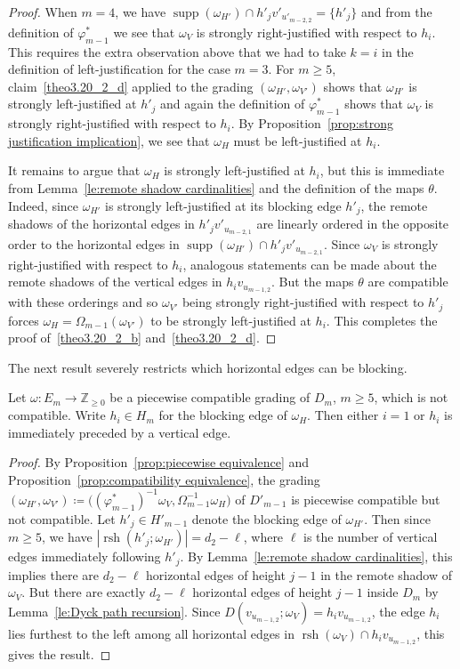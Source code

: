 \documentclass[ALCO,ThmDefs,Unicode,epreuves]{cedram}
\newcommand{\ZZ}{\mathbb{Z}}
\DeclareMathOperator{\supp}{supp}
\DeclareMathOperator{\rsh}{rsh}
\begin{document}
\begin{proof}
 When $m=4$, we have $\supp(\omega_{H'})\cap h'_jv'_{u'_{m-2,2}}=\{h'_j\}$ and from the definition of $\varphi^*_{m-1}$ we see that $\omega_V$ is strongly right-justified with respect to $h_i$.
 This requires the extra observation above that we had to take $k=i$ in the definition of left-justification for the case $m=3$.
 For $m\ge5$, claim~\ref{theo3.20_2_d} applied to the grading $(\omega_{H'},\omega_{V'})$ shows that $\omega_{H'}$ is strongly left-justified at $h'_j$ and again the definition of $\varphi^*_{m-1}$ shows that $\omega_V$ is strongly right-justified with respect to $h_i$. 
 By Proposition~\ref{prop:strong justification implication}, we see that $\omega_H$ must be left-justified at $h_i$. 

 It remains to argue that $\omega_H$ is strongly left-justified at $h_i$, but this is immediate from Lemma~\ref{le:remote shadow cardinalities} and the definition of the maps $\theta$. 
 Indeed, since $\omega_{H'}$ is strongly left-justified at its blocking edge $h'_j$, the remote shadows of the horizontal edges in $h'_jv'_{u_{m-2,1}}$ are linearly ordered in the opposite order to the horizontal edges in $\supp(\omega_{H'})\cap h'_jv'_{u_{m-2,1}}$. 
 Since $\omega_V$ is strongly right-justified with respect to $h_i$, analogous statements can be made about the remote shadows of the vertical edges in $h_iv_{u_{m-1,2}}$. 
 But the maps $\theta$ are compatible with these orderings and so $\omega_{V'}$ being strongly right-justified with respect to $h'_j$ forces $\omega_H=\Omega_{m-1}(\omega_{V'})$ to be strongly left-justified at $h_i$.
 This completes the proof of~\ref{theo3.20_2_b} and~\ref{theo3.20_2_d}.
\end{proof}

The next result severely restricts which horizontal edges can be blocking.
\begin{corollary}
 Let $\omega:E_m\to\ZZ_{\ge0}$ be a piecewise compatible grading of $D_m$, $m\ge5$, which is not compatible.
 Write $h_i\in H_m$ for the blocking edge of $\omega_H$.
 Then either $i=1$ or $h_i$ is immediately preceded by a vertical edge.
\end{corollary}
\begin{proof}
 By Proposition~\ref{prop:piecewise equivalence} and Proposition~\ref{prop:compatibility equivalence}, the grading $(\omega_{H'},\omega_{V'})\coloneqq \big((\varphi^*_{m-1})^{-1}\omega_V,\Omega_{m-1}^{-1}\omega_H)$ of $D'_{m-1}$ is piecewise compatible but not compatible.
 Let $h'_j\in H'_{m-1}$ denote the blocking edge of $\omega_{H'}$.
 Then since $m\ge5$, we have $|\rsh(h'_j;\omega_{H'})|=d_2-\ell$, where $\ell$ is the number of vertical edges immediately following $h'_j$.
 By Lemma~\ref{le:remote shadow cardinalities}, this implies there are $d_2-\ell$ horizontal edges of height $j-1$ in the remote shadow of $\omega_V$.
 But there are exactly $d_2-\ell$ horizontal edges of height $j-1$ inside $D_m$ by Lemma~\ref{le:Dyck path recursion}.
 Since $D(v_{u_{m-1,2}};\omega_V)=h_iv_{u_{m-1,2}}$, the edge $h_i$ lies furthest to the left among all horizontal edges in $\rsh(\omega_V)\cap h_iv_{u_{m-1,2}}$, this gives the result.
\end{proof}
\end{document}
